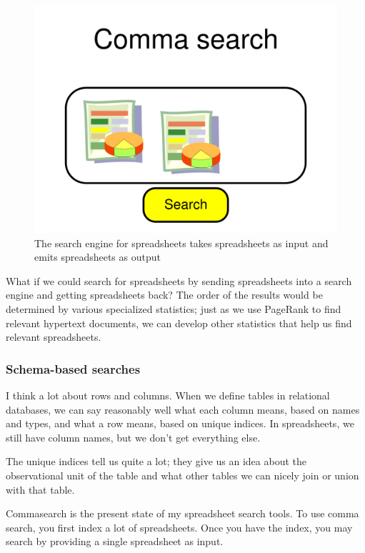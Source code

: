 \documentclass{acm_proc_article-sp}
\begin{document}
\begin{figure}
\includegraphics[width=\columnwidth]{../pagerank-for-spreadsheets/commasearch.png}
\caption{The search engine for spreadsheets takes spreadsheets as input and emits spreadsheets as output}
\centering
\end{figure}

What if we could search for spreadsheets
by sending spreadsheets into a search engine and getting spreadsheets back?
The order of the results would be determined by various specialized statistics;
just as we use PageRank to find relevant hypertext documents, we can develop
other statistics that help us find relevant spreadsheets.

\subsubsection{Schema-based searches}
I think a lot about rows and columns. When we define tables in relational
databases, we can say reasonably well what each column means, based on
names and types, and what a row means, based on unique indices.
In spreadsheets, we still have column names, but we don't get everything
else.

The unique indices tell us quite a lot; they give us an idea about the
observational unit of the table and what other tables we can nicely
join or union with that table.

Commasearch \cite{commasearch} is the present state of my spreadsheet search
tools. To use comma search, you first index a lot of spreadsheets. Once you
have the index, you may search by providing a single spreadsheet as input.
\end{document}
